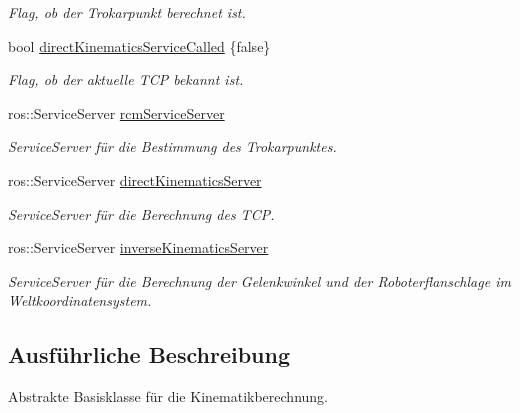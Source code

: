 \begin{DoxyCompactItemize}
\begin{DoxyCompactList}\small\item\em Flag, ob der Trokarpunkt berechnet ist. \end{DoxyCompactList}\item 
\hypertarget{classIKinematic_ad4984adc0630f9beaaebc83bc9b46bea}{bool \hyperlink{classIKinematic_ad4984adc0630f9beaaebc83bc9b46bea}{direct\-Kinematics\-Service\-Called} \{false\}}\label{classIKinematic_ad4984adc0630f9beaaebc83bc9b46bea}

\begin{DoxyCompactList}\small\item\em Flag, ob der aktuelle T\-C\-P bekannt ist. \end{DoxyCompactList}\item 
\hypertarget{classIKinematic_a98088de541bed2487314000b1b0c5e1c}{ros\-::\-Service\-Server \hyperlink{classIKinematic_a98088de541bed2487314000b1b0c5e1c}{rcm\-Service\-Server}}\label{classIKinematic_a98088de541bed2487314000b1b0c5e1c}

\begin{DoxyCompactList}\small\item\em Service\-Server für die Bestimmung des Trokarpunktes. \end{DoxyCompactList}\item 
\hypertarget{classIKinematic_a23847e7210bfeb2a62ad68de4a9ae6e1}{ros\-::\-Service\-Server \hyperlink{classIKinematic_a23847e7210bfeb2a62ad68de4a9ae6e1}{direct\-Kinematics\-Server}}\label{classIKinematic_a23847e7210bfeb2a62ad68de4a9ae6e1}

\begin{DoxyCompactList}\small\item\em Service\-Server für die Berechnung des T\-C\-P. \end{DoxyCompactList}\item 
\hypertarget{classIKinematic_acf7b1bf907b0f1a3f8d8aad56382c7a0}{ros\-::\-Service\-Server \hyperlink{classIKinematic_acf7b1bf907b0f1a3f8d8aad56382c7a0}{inverse\-Kinematics\-Server}}\label{classIKinematic_acf7b1bf907b0f1a3f8d8aad56382c7a0}

\begin{DoxyCompactList}\small\item\em Service\-Server für die Berechnung der Gelenkwinkel und der Roboterflanschlage im Weltkoordinatensystem. \end{DoxyCompactList}\end{DoxyCompactItemize}


\subsection{Ausführliche Beschreibung}
Abstrakte Basisklasse für die Kinematikberechnung. 

